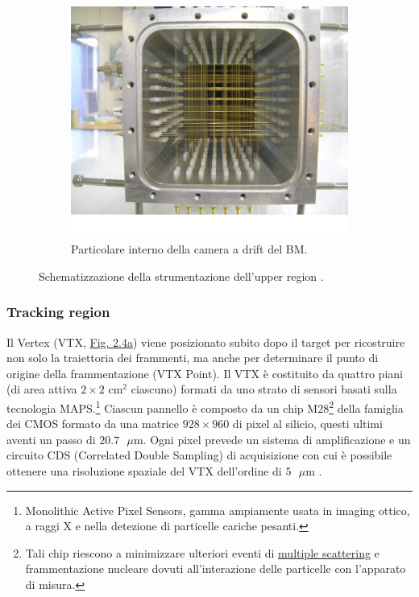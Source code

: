 \documentclass[12pt,a4paper,twoside]{report}
\begin{document}
\begin{figure}[H]
\begin{subfigure}[t]{0.49\textwidth}
			\includegraphics[width=\textwidth, scale=0.5]{beam_monitor.jpg}
			\caption{Particolare interno della camera a drift del BM.}
			\label{fig:beam_monitor}
		\end{subfigure}
		\caption{Schematizzazione della strumentazione dell'upper region \cite{slide_spighi}.}
	\end{figure}
	
	\subsubsection{Tracking region}\label{par:tracking_region}
	Il Vertex (VTX, \hyperref[fig:vtx]{Fig. 2.4a}) viene posizionato subito dopo il target per ricostruire non solo la traiettoria dei frammenti, ma anche per determinare il punto di origine della frammentazione (VTX Point). Il VTX è costituito da quattro piani (di area attiva $2\times2\mbox{ cm}^2$ ciascuno) formati da uno strato di sensori basati sulla tecnologia MAPS.\footnote{Monolithic Active Pixel Sensors, gamma ampiamente usata in imaging ottico, a raggi X e nella detezione di particelle cariche pesanti.} Ciascun pannello è composto da un chip M$28$\footnote{Tali chip riescono a minimizzare ulteriori eventi di \hyperref[par:scattering_Rutherford]{multiple scattering} e frammentazione nucleare dovuti all'interazione delle particelle con l'apparato di misura.} della famiglia dei CMOS formato da una matrice $928\times960$ di pixel al silicio, questi ultimi aventi un passo di $20.7\mbox{ }\mu\mbox{m}$. Ogni pixel prevede un sistema di amplificazione e un circuito CDS (Correlated Double Sampling) di acquisizione con cui è possibile ottenere una risoluzione spaziale del VTX dell'ordine di $5\mbox{ }\mu\mbox{m}$ \cite{foot_cdr,ridolfiArticle}.
	
\end{document}
